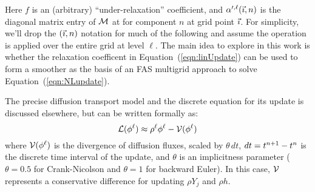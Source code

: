 \documentclass[11pt]{article}
\begin{document}
Here $f$ is an (arbitrary) ``under-relaxation'' coefficient, and
${\alpha}^{\prime,\ell}({\vec \imath},n)$ is the diagonal matrix entry of ${\cal
  M}$ at for component $n$ at grid point ${\vec \imath}$.  For simplicity, we'll
drop the $({\vec \imath},n)$ notation for much of the following and assume the
operation is applied over the entire grid at level $\ell$.  The main
idea to explore in this work is whether the relaxation coefficent in
Equation~(\ref{eqn:linUpdate}) can be used to form a smoother as the
basis of an FAS multigrid approach to solve
Equation~(\ref{eqn:NLupdate}).

The precise diffusion transport model and the discrete equation for
its update is discussed elsewhere, but can be written formally as:
\[
  {\cal L}({\phi}^{\ell}) \approx {\rho}^{\ell} {\phi}^{\ell} - {\cal V}({\phi}^{\ell})
\]
where ${\cal V}({\phi}^{\ell})$ is the divergence of diffusion fluxes,
scaled by $\theta \, dt$, $dt = {t^{n+1}} - {t^{n}}$ is the discrete time
interval of the update, and $\theta$ is an implicitness parameter
($\theta = 0.5$ for Crank-Nicolson and $\theta=1$ for backward Euler).
In this case, ${\cal V}$ represents a conservative difference for
updating $\rho Y_{j}$ and $\rho h$.
\end{document}
